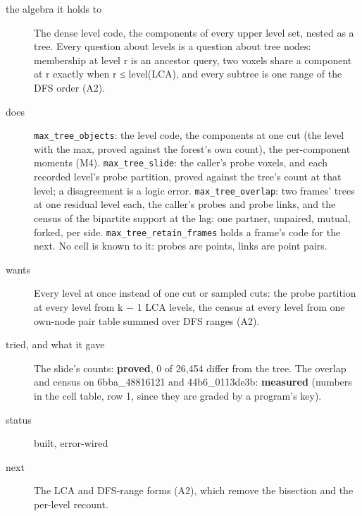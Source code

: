 \begin{description}
\item[{the algebra it holds to}] The dense level code, the components of every upper level set, nested as a tree. Every question about levels is a question about tree nodes: membership at level r is an ancestor query, two voxels share a component at r exactly when r ≤ level(LCA), and every subtree is one range of the DFS order (A2).
\item[{does}] \texttt{max\_\allowbreak{}tree\_\allowbreak{}objects}: the level code, the components at one cut (the level with the max, proved against the forest's own count), the per-component moments (M4). \texttt{max\_\allowbreak{}tree\_\allowbreak{}slide}: the caller's probe voxels, and each recorded level's probe partition, proved against the tree's count at that level; a disagreement is a logic error. \texttt{max\_\allowbreak{}tree\_\allowbreak{}overlap}: two frames' trees at one residual level each, the caller's probes and probe links, and the census of the bipartite support at the lag: one partner, unpaired, mutual, forked, per side. \texttt{max\_\allowbreak{}tree\_\allowbreak{}retain\_\allowbreak{}frames} holds a frame's code for the next. No cell is known to it: probes are points, links are point pairs.
\item[{wants}] Every level at once instead of one cut or sampled cuts: the probe partition at every level from k − 1 LCA levels, the census at every level from one own-node pair table summed over DFS ranges (A2).
\item[{tried, and what it gave}] The slide's counts: \textbf{proved}, 0 of 26,454 differ from the tree. The overlap and census on 6bba\_\allowbreak{}48816121 and 44b6\_\allowbreak{}0113de3b: \textbf{measured} (numbers in the cell table, row 1, since they are graded by a program's key).
\item[{status}] built, error-wired
\item[{next}] The LCA and DFS-range forms (A2), which remove the bisection and the per-level recount.
\end{description}

